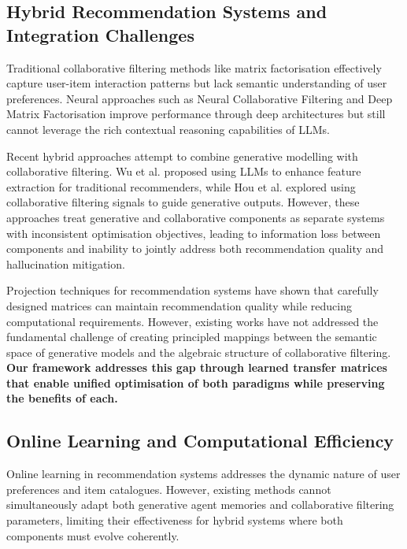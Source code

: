 \documentclass[acmsmall]{acmart}
\begin{document}
\subsection{Hybrid Recommendation Systems and Integration Challenges}

Traditional collaborative filtering methods like matrix factorisation \cite{koren2009matrix, salakhutdinov2007probabilistic} effectively capture user-item interaction patterns but lack semantic understanding of user preferences. Neural approaches such as Neural Collaborative Filtering \cite{he2017neural} and Deep Matrix Factorisation \cite{xue2017deep} improve performance through deep architectures but still cannot leverage the rich contextual reasoning capabilities of LLMs.

Recent hybrid approaches attempt to combine generative modelling with collaborative filtering. Wu et al. \cite{wu2024llm} proposed using LLMs to enhance feature extraction for traditional recommenders, while Hou et al. \cite{hou2024collaborative} explored using collaborative filtering signals to guide generative outputs. However, these approaches treat generative and collaborative components as separate systems with inconsistent optimisation objectives, leading to information loss between components and inability to jointly address both recommendation quality and hallucination mitigation.

Projection techniques for recommendation systems \cite{zhou2024similarity, wang2023projection} have shown that carefully designed matrices can maintain recommendation quality while reducing computational requirements. However, existing works have not addressed the fundamental challenge of creating principled mappings between the semantic space of generative models and the algebraic structure of collaborative filtering. \textbf{Our framework addresses this gap through learned transfer matrices that enable unified optimisation of both paradigms while preserving the benefits of each.}

\subsection{Online Learning and Computational Efficiency}

Online learning in recommendation systems \cite{wang2023online, kumar2023efficient} addresses the dynamic nature of user preferences and item catalogues. However, existing methods cannot simultaneously adapt both generative agent memories and collaborative filtering parameters, limiting their effectiveness for hybrid systems where both components must evolve coherently.
\end{document}
